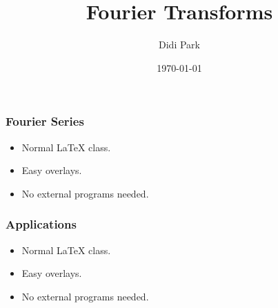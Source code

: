 \documentclass{beamer}
\title{Fourier Transforms}
\author{Didi Park}
\date{\today}
\begin{document}
\frame{\titlepage}


\frame
{
  \frametitle{Fourier Series}

  \begin{itemize}
  \item<1-> Normal LaTeX class.
  \item<2-> Easy overlays.
  \item<3-> No external programs needed.      
  \end{itemize}
}
\frame
{
  \frametitle{Applications}

  \begin{itemize}
  \item<1-> Normal LaTeX class.
  \item<2-> Easy overlays.
  \item<3-> No external programs needed.      
  \end{itemize}
}
\end{document}
